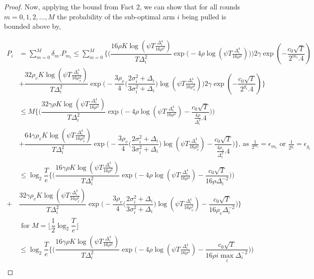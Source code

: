 \begin{proof}
Now, applying the bound from Fact $2$, we can show that for all rounds $m=0,1,2,...,M$ the probability of the sub-optimal arm $i$ being pulled is bounded above by,

\begin{align*}
P_{i} &= \sum_{m=0}^{M} \delta_{m}.P_{m_{i}} \leq \sum_{m=0}^{M} \bigg\lbrace \bigg(\dfrac{16\rho K\log (\psi T \frac{\Delta_{i}^{4}}{16\rho^{2}})}{T\Delta_{i}^{2}}\exp\big(-4\rho\log (\psi T\frac{\Delta_{i}^{4}}{16\rho^{2}})\big)\bigg) 2\gamma \exp(-\dfrac{c_{0}\sqrt{T}}{2^{m_{i}}.4}) \\ &+  \dfrac{32\rho_v K\log (\psi T \frac{\Delta_{i}^{4}}{16\rho_{v}^{2}})}{T\Delta_{i}^{2}}\exp\bigg(- \dfrac{3\rho_v}{4} \bigg(\dfrac{2\sigma_{i}^{2}+\Delta_{i}}{3\sigma_{i}^{2}+\Delta_{i}}\bigg) \log(\psi T\frac{\Delta_{i}^{4}}{16\rho_{v}^{2}}) \bigg) 2\gamma \exp(-\dfrac{c_{0}\sqrt{T}}{2^{g_{i}}.4})\bigg\rbrace\\
& \leq M \bigg\lbrace \bigg(\dfrac{32\gamma\rho K\log (\psi T \frac{\Delta_{i}^{4}}{16\rho^{2}})}{T\Delta_{i}^{2}}\exp\big(-4\rho\log (\psi T\frac{\Delta_{i}^{4}}{16\rho^{2}})-\dfrac{c_{0}\sqrt{T}}{\frac{4\rho}{\Delta_{i}^{2}}.4}\big)\bigg)\\
& + \dfrac{64\gamma\rho_v K\log (\psi T \frac{\Delta_{i}^{4}}{16\rho_{v}^{2}})}{T\Delta_{i}^{2}}\exp\bigg(- \dfrac{3\rho_v}{4} \bigg(\dfrac{2\sigma_{i}^{2}+\Delta_{i}}{3\sigma_{i}^{2}+\Delta_{i}}\bigg)\log(\psi T\frac{\Delta_{i}^{4}}{16\rho_{v}^{2}}) -\dfrac{c_{0}\sqrt{T}}{\frac{4\rho_v}{\Delta_{i}^{2}}.4}  \bigg) \bigg\rbrace \text{, as $\frac{1}{2^{m_{i}}}=\epsilon_{m_{i}}$ or $\frac{1}{2^{g_{i}}}=\epsilon_{g_{i}}$ }  \\
& \leq \log_{2}\dfrac{T}{e}\bigg\lbrace \bigg(\dfrac{16\gamma\rho K\log (\psi T \frac{\Delta_{i}^{4}}{16\rho^{2}})}{T\Delta_{i}^{2}}\exp\big(-4\rho\log (\psi T\frac{\Delta_{i}^{4}}{16\rho^{2}})-\dfrac{c_{0}\sqrt{T}}{16\rho\Delta_{i}^{-2}}\big)\bigg)\\
+ &  \dfrac{32\gamma\rho_v K\log (\psi T \frac{\Delta_{i}^{4}}{16\rho_{v}^{2}})}{T\Delta_{i}^{2}}\exp\bigg(- \dfrac{3\rho_v}{4} \bigg(\dfrac{2\sigma_{i}^{2}+\Delta_{i}}{3\sigma_{i}^{2}+\Delta_{i}}\bigg)\log(\psi T\frac{\Delta_{i}^{4}}{16\rho_{v}^{2}}) -\dfrac{c_{0}\sqrt{T}}{16\rho_v\Delta_{i}^{-2}}  \bigg)\bigg\rbrace\\
&\text{ for $M=\big \lfloor \dfrac{1}{2}\log_{2} \dfrac{T}{e}\big\rfloor$}\\
& \leq \log_{2}\dfrac{T}{e}\bigg\lbrace \bigg(\dfrac{16\gamma\rho K\log (\psi T \frac{\Delta_{i}^{4}}{16\rho^{2}})}{T\Delta_{i}^{2}}\exp\big(-4\rho\log (\psi T\frac{\Delta_{i}^{4}}{16\rho^{2}})-\dfrac{c_{0}\sqrt{T}}{16\rho i\max_{i}\Delta_{i}^{-2}}\big)\bigg) \\

\end{align*}
\end{proof}
